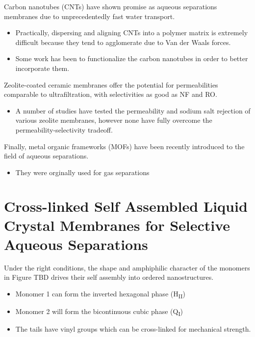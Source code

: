   Carbon nanotubes (CNTs) have shown promise as aqueous separations membranes
  due to unprecedentedly fast water transport.\cite{humplik_nanostructured_2011,hummer_water_2001}
  \begin{itemize}
	\item Practically, dispersing and aligning CNTs into a polymer matrix is extremely
    difficult because they tend to agglomerate due to Van der Waals forces.~\cite{sahoo_polymer_2010}
    \item Some work has been to functionalize the carbon nanotubes in order to better incorporate them. %
  \end{itemize}
  
  Zeolite-coated ceramic membranes offer the potential for permeabilities
  comparable to ultrafiltration, with selectivities as good as NF and RO.%
  \begin{itemize}
	\item A number of studies have tested the permeability and sodium salt rejection
    of various zeolite membranes, however none have fully overcome the
    permeability-selectivity tradeoff.~\cite{pendergast_review_2011,auerbach_handbook_2003,li_novel_2007}
  \end{itemize}

  Finally, metal organic frameworks (MOFs) have been recently introduced to the
  field of aqueous separations.
  \begin{itemize}
    \item They were orginally used for gas separations
  \end{itemize}
  
  \section{Cross-linked Self Assembled Liquid Crystal Membranes for Selective Aqueous Separations}
  
  Under the right conditions, the shape and amphiphilic character of the monomers in 
  Figure TBD drives their self assembly into ordered nanostructures.
  \begin{itemize}
    \item Monomer 1 can form the inverted hexagonal phase (H\textsubscript{II})
    \item Monomer 2 will form the bicontinuous cubic phase (Q\textsubscript{I})
    \item The tails have vinyl groups which can be cross-linked for mechanical strength.
  \end{itemize}
  
